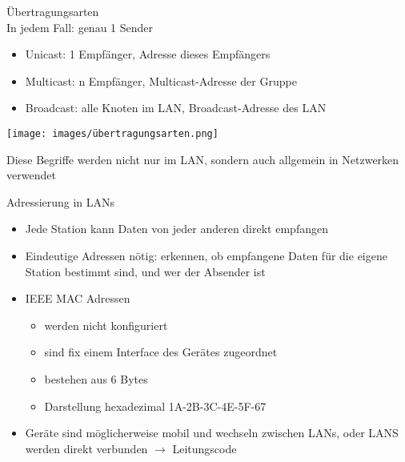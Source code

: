 \begin{definition}{Übertragungsarten}\\
    In jedem Fall: genau 1 Sender
    \begin{itemize}
        \item Unicast: 1 Empfänger, Adresse dieses Empfängers
        \item Multicast: n Empfänger, Multicast-Adresse der Gruppe
        \item Broadcast: alle Knoten im LAN, Broadcast-Adresse des LAN
    \end{itemize}
    \begin{minipage}{0.35\linewidth}
        \texttt{[image: images/übertragungsarten.png]}
    \end{minipage}
    \begin{minipage}{0.6\linewidth}
        Diese Begriffe werden nicht nur im LAN, sondern auch allgemein in Netzwerken verwendet
    \end{minipage}
\end{definition}

\begin{concept}{Adressierung in LANs}
    \begin{itemize}
        \item Jede Station kann Daten von jeder anderen direkt empfangen
        \item Eindeutige Adressen nötig:  erkennen, ob empfangene Daten für die eigene Station bestimmt sind, und wer der Absender ist
        \item IEEE MAC Adressen
        \begin{itemize}
            \item werden nicht konfiguriert
            \item sind fix einem Interface des Gerätes zugeordnet
            \item bestehen aus 6 Bytes
            \item Darstellung hexadezimal 1A-2B-3C-4E-5F-67
        \end{itemize}
        \item Geräte sind möglicherweise mobil und wechseln zwischen LANs, oder LANS werden direkt verbunden $\longrightarrow$ Leitungscode
    \end{itemize}
\end{concept}



